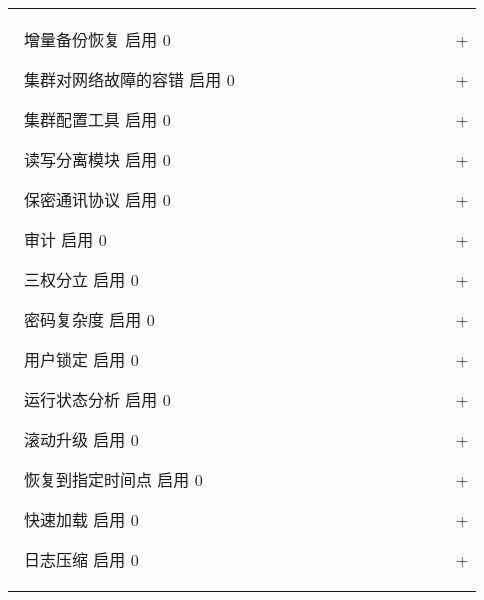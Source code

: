 \documentclass[a4,10pt,oneside,english]{sphinxmanual}
\begin{document}
\begin{savenotes}
\begin{tabulary}{\linewidth}[t]{|T|}
 增量备份恢复 \sphinxhyphen{}\sphinxhyphen{}\sphinxhyphen{} 启用 \sphinxhyphen{}\sphinxhyphen{}\sphinxhyphen{} 0                                    +

 集群对网络故障的容错 \sphinxhyphen{}\sphinxhyphen{}\sphinxhyphen{} 启用 \sphinxhyphen{}\sphinxhyphen{}\sphinxhyphen{} 0                            +

 集群配置工具 \sphinxhyphen{}\sphinxhyphen{}\sphinxhyphen{} 启用 \sphinxhyphen{}\sphinxhyphen{}\sphinxhyphen{} 0                                    +

 读写分离模块 \sphinxhyphen{}\sphinxhyphen{}\sphinxhyphen{} 启用 \sphinxhyphen{}\sphinxhyphen{}\sphinxhyphen{} 0                                    +

 保密通讯协议 \sphinxhyphen{}\sphinxhyphen{}\sphinxhyphen{} 启用 \sphinxhyphen{}\sphinxhyphen{}\sphinxhyphen{} 0                                    +

 审计 \sphinxhyphen{}\sphinxhyphen{}\sphinxhyphen{} 启用 \sphinxhyphen{}\sphinxhyphen{}\sphinxhyphen{} 0                                            +

 三权分立 \sphinxhyphen{}\sphinxhyphen{}\sphinxhyphen{} 启用 \sphinxhyphen{}\sphinxhyphen{}\sphinxhyphen{} 0                                        +

 密码复杂度 \sphinxhyphen{}\sphinxhyphen{}\sphinxhyphen{} 启用 \sphinxhyphen{}\sphinxhyphen{}\sphinxhyphen{} 0                                      +

 用户锁定 \sphinxhyphen{}\sphinxhyphen{}\sphinxhyphen{} 启用 \sphinxhyphen{}\sphinxhyphen{}\sphinxhyphen{} 0                                        +

 运行状态分析 \sphinxhyphen{}\sphinxhyphen{}\sphinxhyphen{} 启用 \sphinxhyphen{}\sphinxhyphen{}\sphinxhyphen{} 0                                    +

 滚动升级 \sphinxhyphen{}\sphinxhyphen{}\sphinxhyphen{} 启用 \sphinxhyphen{}\sphinxhyphen{}\sphinxhyphen{} 0                                        +

 恢复到指定时间点 \sphinxhyphen{}\sphinxhyphen{}\sphinxhyphen{} 启用 \sphinxhyphen{}\sphinxhyphen{}\sphinxhyphen{} 0                                +

 快速加载 \sphinxhyphen{}\sphinxhyphen{}\sphinxhyphen{} 启用 \sphinxhyphen{}\sphinxhyphen{}\sphinxhyphen{} 0                                        +

 日志压缩 \sphinxhyphen{}\sphinxhyphen{}\sphinxhyphen{} 启用 \sphinxhyphen{}\sphinxhyphen{}\sphinxhyphen{} 0                                        +


\end{tabulary}
\end{savenotes}
\end{document}
